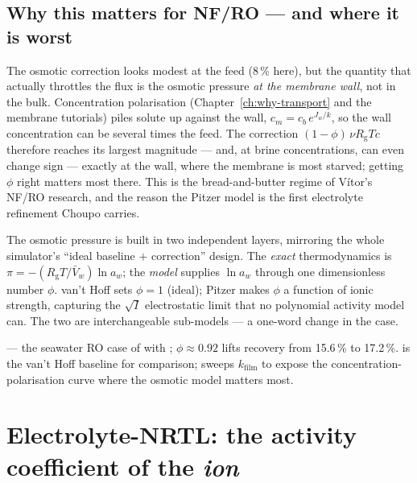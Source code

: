 \documentclass[11pt,a4paper]{article}
\newcommand{\Rgas}{R_{\!\mathrm{g}}}                %
\begin{document}
\subsection{Why this matters for NF/RO --- and where it is worst}

The osmotic correction looks modest at the feed (8\,\% here), but the
quantity that actually throttles the flux is the osmotic pressure
\emph{at the membrane wall}, not in the bulk.  Concentration
polarisation (Chapter~\ref{ch:why-transport} and the membrane
tutorials) piles solute up against the wall, $c_m = c_b\,e^{J_w/k}$,
so the wall concentration can be several times the feed.  The
correction $(1-\phi)\,\nu\Rgas T c$ therefore reaches its largest
magnitude --- and, at brine concentrations, can even change sign ---
exactly at the wall, where the membrane is most starved; getting $\phi$
right matters most there.  This is the bread-and-butter regime of
Vítor's NF/RO research, and the reason the Pitzer model is the first
electrolyte refinement Choupo carries.

\begin{keyidea}
The osmotic pressure is built in two independent layers, mirroring the
whole simulator's ``ideal baseline $+$ correction'' design.  The
\emph{exact} thermodynamics is $\pi = -(\Rgas T/\bar V_w)\ln a_w$; the
\emph{model} supplies $\ln a_w$ through one dimensionless number
$\phi$.  van't Hoff sets $\phi = 1$ (ideal); Pitzer makes $\phi$ a
function of ionic strength, capturing the $\sqrt I$ electrostatic
limit that no polynomial activity model can.  The two are
interchangeable  sub-models --- a one-word change
in the case.
\end{keyidea}

\begin{tutoriallink}
 --- the seawater RO case of
 with ; $\phi
\approx 0.92$ lifts recovery from 15.6\,\% to 17.2\,\%.
 is the van't
Hoff baseline for comparison;  sweeps $k_{\text{film}}$
to expose the concentration-polarisation curve where the osmotic model
matters most.
\end{tutoriallink}

\section{Electrolyte-NRTL: the activity coefficient of the
\emph{ion}}\label{ch:enrtl}
\end{document}
